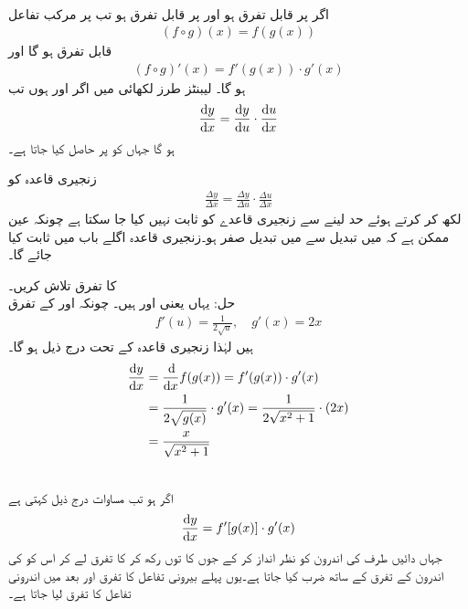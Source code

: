 \\
اگر  پر  قابل تفرق ہو اور  پر  قابل تفرق ہو تب  پر مرکب تفاعل
\begin{align*}
 (f\circ g)(x)=f(g(x))
\end{align*}
قابل تفرق ہو گا اور
\begin{align}\label{مساوات_تفرق_زنجیری_الف}
(f\circ g)'(x)=f'(g(x))\cdot g'(x)
\end{align}
ہو گا۔ لیبنٹز طرز لکھائی میں اگر  اور  ہوں تب 
\begin{align}\label{مساوات_تفرق_زنجیری_ب}
\frac{\dif y}{\dif x}=\frac{\dif y}{\dif u}\cdot \frac{\dif u}{\dif x}
\end{align}
ہو گا جہاں  کو  پر حاصل کیا جاتا ہے۔

زنجیری قاعدہ کو
\begin{align*}
\frac{\Delta y}{\Delta x}=\frac{\Delta y}{\Delta u}\cdot \frac{\Delta u}{\Delta x}
\end{align*}
لکھ کر  کرتے ہوئے حد لینے سے زنجیری قاعدے کو ثابت نہیں کیا جا سکتا ہے چونکہ عین ممکن ہے کہ  میں تبدیل سے  میں تبدیل  صفر ہو۔زنجیری قاعدہ اگلے باب میں ثابت کیا جائے گا۔ 


 کا تفرق تلاش کریں۔\\
حل:\quad
یہاں  یعنی  اور  ہیں۔ چونکہ  اور  کے تفرق
\begin{align*}
f'(u)=\frac{1}{2\sqrt{u}},\quad g'(x)=2x
\end{align*}
ہیں لہٰذا زنجیری قاعدہ کے تحت درج ذیل ہو گا۔
\begin{align*}
\frac{\dif y}{\dif x}&=\frac{\dif}{\dif x}f(g(x))=f'(g(x))\cdot g'(x)\\
&=\frac{1}{2\sqrt{g(x)}}\cdot g'(x)=\frac{1}{2\sqrt{x^2+1}}\cdot (2x)\\
&=\frac{x}{\sqrt{x^2+1}}
\end{align*}

\\
اگر  ہو تب مساوات  درج ذیل کہتی ہے
\begin{align}
\frac{\dif y}{\dif x}=f'[g(x)]\cdot g'(x)
\end{align}
جہاں دائیں طرف  کی اندرون کو نظر انداز کر کے جوں کا توں رکھ کر   کا تفرق لے کر اس کو  کی اندرون کے تفرق کے ساتھ ضرب کیا جاتا ہے۔یوں پہلے بیرونی تفاعل کا تفرق اور بعد میں اندرونی تفاعل کا تفرق لیا جاتا ہے۔

